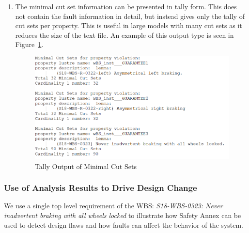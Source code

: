\begin{enumerate}
\item The minimal cut set information can be presented in tally form. This does not contain the fault information in detail, but instead gives only the tally of cut sets per property. This is useful in large models with many cut sets as it reduces the size of the text file. An example of this output type is seen in Figure~\ref{fig:tallyMCS}.
\begin{figure}[htbp]
	\hspace*{-2cm}
	\vspace{-0.1in} 
	\begin{center}
		\includegraphics[scale=0.7]{images/wbsMCSTally.png}
	\caption{Tally Output of Minimal Cut Sets}
		\label{fig:tallyMCS}
	\end{center}
\end{figure}

\end{enumerate}

\subsubsection{Use of Analysis Results to Drive Design Change}
\label{sec:designChange}
We use a single top level requirement of the WBS: {\em S18-WBS-0323: Never inadvertent braking with all wheels locked} to illustrate how Safety Annex can be used to detect design flaws and how faults can affect the behavior of the system. 

